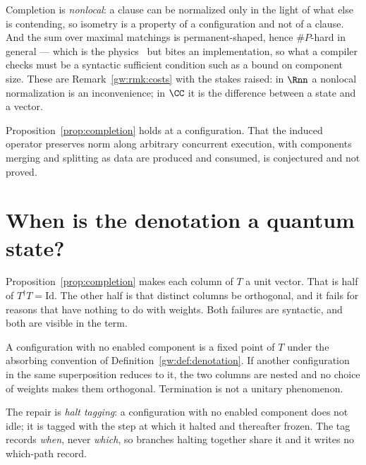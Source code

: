 \begin{remark}
Completion is \emph{nonlocal}: a clause can be normalized only in the light
of what else is contending, so isometry is a property of a configuration and
not of a clause.  And the sum over maximal matchings is permanent-shaped,
hence $\#P$-hard in general --- which is the physics~\cite{AaronsonArkhipov}
but bites an implementation, so what a compiler checks must be a syntactic
sufficient condition such as a bound on component size.  These are
Remark~\ref{gw:rmk:costs} with the stakes raised: in $\Rnn$ a nonlocal
normalization is an inconvenience; in $\CC$ it is the difference between a
state and a vector.
\end{remark}

\begin{conjecture}
\label{conj:global}
Proposition~\ref{prop:completion} holds at a configuration.  That the
induced operator preserves norm along arbitrary concurrent execution, with
components merging and splitting as data are produced and consumed, is
conjectured and not proved.
\end{conjecture}

\section{When is the denotation a quantum state?}
\label{sec:fragment}

Proposition~\ref{prop:completion} makes each column of $T$ a unit vector.
That is half of $T^{\dagger}T = \mathrm{Id}$.  The other half is that distinct
columns be orthogonal, and it fails for reasons that have nothing to do with
weights.  Both failures are syntactic, and both are visible in the term.

\begin{proposition}[Absorption]
\label{prop:absorb}
A configuration with no enabled component is a fixed point of $T$ under the
absorbing convention of Definition~\ref{gw:def:denotation}.  If another
configuration in the same superposition reduces to it, the two columns are
nested and no choice of weights makes them orthogonal.  Termination is not a
unitary phenomenon.
\end{proposition}

The repair is \emph{halt tagging}: a configuration with no enabled component
does not idle; it is tagged with the step at which it halted and thereafter
frozen.  The tag records \emph{when}, never \emph{which}, so branches halting
together share it and it writes no which-path record.


